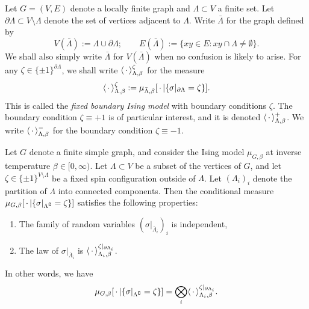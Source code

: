 \begin{definition}
    Let $G=(V,E)$ denote a locally finite graph and $\Lambda\subset V$ a finite set.
    Let $\partial\Lambda\subset V\setminus\Lambda$ denote the set of vertices adjacent to $\Lambda$.
    Write $\bar\Lambda$ for the graph defined by
    \[
        V(\bar\Lambda):=\Lambda\cup\partial\Lambda;\qquad
        E(\bar\Lambda):=\{xy\in E:xy\cap\Lambda\neq\emptyset\}.
    \]
    We shall also simply write $\bar\Lambda$ for $V(\bar\Lambda)$ when no confusion is
    likely to arise.
    For any $\zeta\in\{\pm1\}^{\partial\Lambda}$,
    we shall write $\langle\,\cdot\,\rangle_{\Lambda,\beta}^\zeta$
    for the measure
    \[
        \langle\,\cdot\,\rangle_{\Lambda,\beta}^\zeta:=\mu_{\bar\Lambda,\beta}[\,\cdot\,|\{\sigma|_{\partial\Lambda}=\zeta\}].
    \]
    This is called the \emph{fixed boundary Ising model} with boundary conditions $\zeta$.
    The boundary condition $\zeta\equiv+1$ is of particular interest,
    and it is denoted $\langle\,\cdot\,\rangle_{\Lambda,\beta}^+$.
    We write $\langle\,\cdot\,\rangle_{\Lambda,\beta}^-$ for the boundary condition $\zeta\equiv-1$.
\end{definition}

\begin{theorem}
    Let $G$ denote a finite simple graph,
    and consider the Ising model $\mu_{G,\beta}$ at inverse temperature $\beta\in[0,\infty)$.
    Let $\Lambda\subset V$ be a subset of the vertices of $G$,
    and let $\zeta\in\{\pm1\}^{V\setminus\Lambda}$ be a fixed spin configuration outside
    of $\Lambda$.
    Let $(\Lambda_i)_i$ denote the partition of $\Lambda$ into connected components.
    Then the conditional measure
    $\mu_{G,\beta}[\,\cdot\,|\{\sigma|_{\Lambda^\complement}=\zeta\}]$ satisfies the
    following properties:
    \begin{enumerate}
        \item The family of random variables $(\sigma|_{\bar\Lambda_i})_i$ is independent,
        \item The law of $\sigma|_{\bar\Lambda_i}$ is
            $\langle\,\cdot\,\rangle_{\Lambda_i,\beta}^{\zeta|_{\partial\Lambda_i}}$.
    \end{enumerate}
    In other words, we have
    \begin{equation}
        \label{eq:markov_property}
        \mu_{G,\beta}[\blank|\{\sigma|_{\Lambda^\complement}=\zeta\}]
        =\bigotimes_i \langle\blank\rangle_{\Lambda_i,\beta}^{\zeta|_{\partial\Lambda_i}}.
    \end{equation}
\end{theorem}

